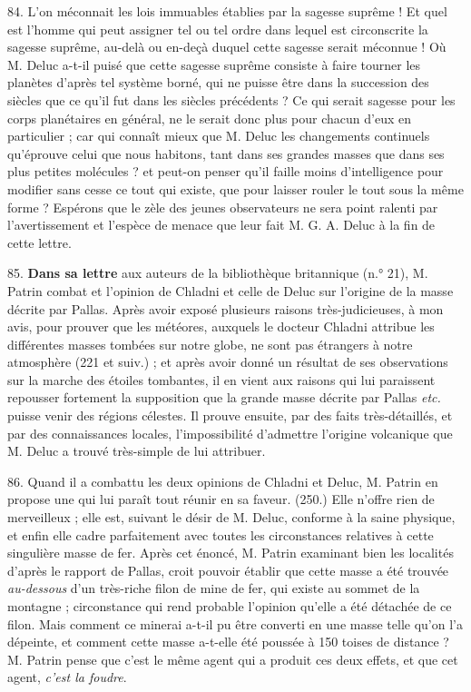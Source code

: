\documentclass[a4paper, 11pt, oneside, polutonikogreek, french]{article}
\begin{document}
84. L'on méconnait les lois immuables établies par la sagesse suprême ! Et quel est l'homme qui peut assigner tel ou tel ordre dans lequel est circonscrite la sagesse suprême, au-delà ou en-deçà duquel cette sagesse serait méconnue ! Où M. Deluc a-t-il puisé que cette sagesse suprême consiste à faire tourner les planètes d'après tel système borné, qui ne puisse être dans la succession des siècles que ce qu'il fut dans les siècles précédents ? Ce qui serait sagesse pour les corps planétaires en général, ne le serait donc plus pour chacun d'eux en particulier ; car qui connaît mieux que M. Deluc les changements continuels qu'éprouve celui que nous habitons, tant dans ses grandes masses que dans ses plus petites molécules ? et peut-on penser qu'il faille moins d'intelligence pour modifier sans cesse ce tout qui existe, que pour laisser rouler le tout sous la même forme ? Espérons que le zèle des jeunes observateurs ne sera point ralenti par l'avertissement et l'espèce de menace que leur fait M. G. A. Deluc à la fin de cette lettre.

85. \textbf{Dans sa lettre} aux auteurs de la bibliothèque britannique (n.° 21), M. Patrin combat et l'opinion de Chladni et celle de Deluc sur l'origine de la masse décrite par Pallas. Après avoir exposé plusieurs raisons très-judicieuses, à mon avis, pour prouver que les météores, auxquels le docteur Chladni attribue les différentes masses tombées sur notre globe, ne sont pas étrangers à notre atmosphère (221 et suiv.) ; et après avoir donné un résultat de ses observations sur la marche des étoiles tombantes, il en vient aux raisons qui lui paraissent repousser fortement la supposition que la grande masse décrite par Pallas \emph{etc.} puisse venir des régions célestes. Il prouve ensuite, par des faits très-détaillés, et par des connaissances locales, l'impossibilité d'admettre l'origine volcanique que M. Deluc a trouvé très-simple de lui attribuer.

86. Quand il a combattu les deux opinions de Chladni et Deluc, M. Patrin en propose une qui lui paraît tout réunir en sa faveur. (250.) \og Elle n'offre rien de merveilleux ; elle est, suivant le désir de M. Deluc, conforme à la saine physique, et enfin elle cadre parfaitement avec toutes les circonstances relatives à cette singulière masse de fer. \fg Après cet énoncé, M. Patrin examinant bien les localités d'après le rapport de Pallas, croit pouvoir établir que cette masse a été trouvée \emph{au-dessous} d'un très-riche filon de mine de fer, qui existe au sommet de la montagne ; circonstance qui rend probable l'opinion qu'elle a été détachée de ce filon. Mais comment ce minerai a-t-il pu être converti en une masse telle qu'on l'a dépeinte, et comment cette masse a-t-elle été poussée à 150 toises de distance ? M. Patrin pense que c'est le même agent qui a produit ces deux effets, et que cet agent, \emph{c'est la foudre}.
\end{document}
